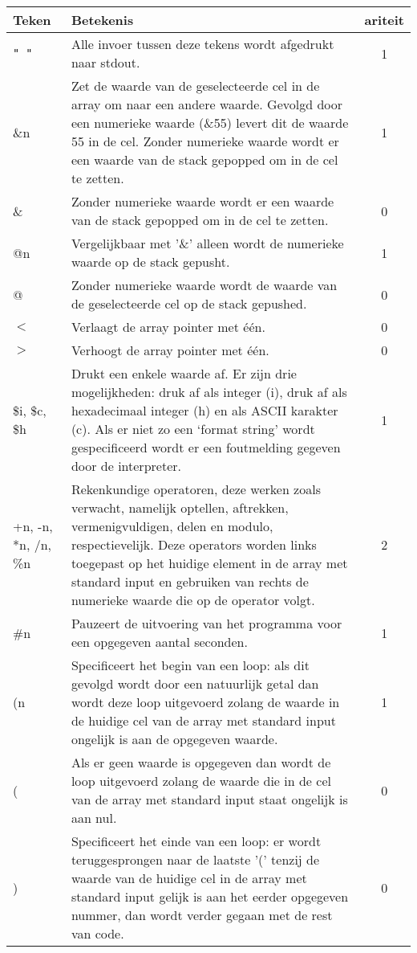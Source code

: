 \documentclass[11pt]{article}
\begin{document}
\begin{center}
    \begin{tabular}{ | l | p{12cm} | c |}
    \hline
    Teken & Betekenis & ariteit \\ \hline
    \verb|" "| & Alle invoer tussen deze tekens wordt afgedrukt naar stdout. & 1 \\ \hline
    \&n & Zet de waarde van de geselecteerde cel in de array om naar een andere waarde. Gevolgd door een numerieke waarde (\&55) levert dit de waarde 55 in de cel. Zonder numerieke waarde wordt er een waarde van de stack gepopped om in de cel te zetten. & 1\\ \hline
    \& & Zonder numerieke waarde wordt er een waarde van de stack gepopped om in de cel te zetten. & 0\\ \hline
    @n & Vergelijkbaar met '\&' alleen wordt de numerieke waarde op de stack gepusht. & 1\\ \hline
    @ & Zonder numerieke waarde wordt de waarde van de geselecteerde cel op de stack gepushed. & 0\\ \hline
    \(<\) & Verlaagt de array pointer met \'e\'en. & 0 \\ \hline
    \(>\) & Verhoogt de array pointer met \'e\'en. & 0 \\ \hline
    \$i, \$c, \$h & Drukt een enkele waarde af. Er zijn drie mogelijkheden: druk af als integer (i), druk af als hexadecimaal integer (h) en als ASCII karakter (c). Als er niet zo een `format string' wordt gespecificeerd wordt er een foutmelding gegeven door de interpreter. & 1 \\ \hline %
    +n, -n, *n, /n, \%n & Rekenkundige operatoren, deze werken zoals verwacht, namelijk optellen, aftrekken, vermenigvuldigen, delen en modulo, respectievelijk. Deze operators worden links toegepast op het huidige element in de array met standard input en gebruiken van rechts de numerieke waarde die op de operator volgt. & 2\\ \hline
    \#n & Pauzeert de uitvoering van het programma voor een opgegeven aantal seconden. & 1\\ \hline %
    (n & Specificeert het begin van een loop: als dit gevolgd wordt door een natuurlijk getal dan wordt deze loop uitgevoerd zolang de waarde in de huidige cel van de array met standard input  ongelijk is aan de opgegeven waarde. & 1 \\ \hline
    ( & Als er geen waarde is opgegeven dan wordt de loop uitgevoerd zolang de waarde die in de cel van de array met standard input staat ongelijk is aan nul. & 0 \\ \hline
    ) & Specificeert het einde van een loop: er wordt teruggesprongen naar de laatste '(' tenzij de waarde van de huidige cel in de array met standard input gelijk is aan het eerder opgegeven nummer, dan wordt verder gegaan met de rest van code. & 0 \\ \hline
  

    \hline
    \end{tabular}
\end{center}
\end{document}
